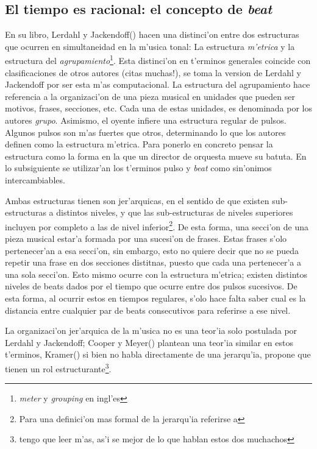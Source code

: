 \subsection{El tiempo es racional: el concepto de \emph{beat}}
\newline
En su libro, Lerdahl y Jackendoff(\cita) hacen una distinci'on entre dos estructuras que ocurren en simultaneidad en la m'usica tonal:
La estructura \emph{m'etrica} y la estructura del \emph{agrupamiento}\footnote{\emph{meter} y \emph{grouping} en ingl'es}. 
Esta distinci'on en t'erminos generales coincide con clasificaciones de otros autores (\alert{citas muchas!}), se toma la version de Lerdahl y Jackendoff 
por ser esta m'as computacional.
La estructura del agrupamiento hace referencia a la organizaci'on de una pieza musical en unidades que pueden ser motivos, frases, secciones, etc. 
Cada una de estas unidades, es denominada por los autores \emph{grupo}. Asimismo, el oyente infiere una estructura regular de pulsos. 
Algunos pulsos son m'as fuertes que otros, determinando lo que los autores definen como la estructura m'etrica. 
Para ponerlo en concreto pensar la estructura como la forma en la que un director de orquesta mueve su batuta. 
En lo subsiguiente se utilizar'an los t'erminos pulso y \emph{beat} como sin'onimos intercambiables.

Ambas estructuras tienen son jer'arquicas, en el sentido de que existen sub-estructuras a distintos niveles, y que las sub-estructuras de niveles superiores 
incluyen por completo a las de nivel inferior\footnote{Para una definici'on mas formal de la jerarqu'ia referirse a \cita}. De esta forma, una secci'on
de una pieza musical estar'a formada por una sucesi'on de frases. Estas frases s'olo pertenecer'an a esa secci'on, sin embargo, esto no quiere decir
que no se pueda repetir una frase en dos secciones distitnas, puesto que cada una pertenecer'a a una sola secci'on. 
Esto mismo ocurre con la estructura m'etrica; existen distintos niveles de beats dados por el tiempo que ocurre entre dos pulsos sucesivos. De esta forma, al 
ocurrir estos en tiempos regulares, s'olo hace falta saber cual es la distancia entre cualquier par de beats consecutivos para referirse a ese nivel. 

La organizaci'on jer'arquica de la m'usica no es una teor'ia solo postulada por Lerdahl y Jackendoff; Cooper y Meyer(\cita) plantean una teor'ia similar en
estos t'erminos, Kramer(\cita) si bien no habla directamente de una jerarqu'ia, propone que tienen un rol 
estructurante\footnote{\alert{tengo que leer m'as, as'i se mejor de lo que hablan estos dos muchachos}}. 

